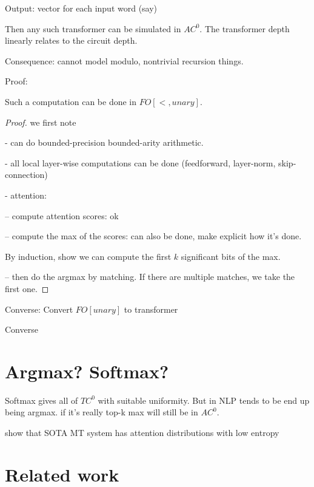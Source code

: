 \documentclass[11pt,a4paper]{article}
\begin{document}
Output: vector for each input word (say)

Then any such transformer can be simulated in $AC^0$. The transformer depth linearly relates to the circuit depth.

Consequence: cannot model modulo, nontrivial recursion things.



Proof:

Such a computation can be done in $FO[<,unary]$.

\begin{proof}
we first note

- can do bounded-precision bounded-arity arithmetic.

- all local layer-wise computations can be done (feedforward, layer-norm, skip-connection)

- attention:

-- compute attention scores: ok

-- compute the max of the scores: can also be done, make explicit how it's done.

By induction, show we can compute the first $k$ significant bits of the max.

-- then do the argmax by matching. If there are multiple matches, we take the first one.

\end{proof}

Converse: Convert $FO[unary]$ to transformer



Converse

\section{Argmax? Softmax?}

Softmax gives all of $TC^0$ with suitable uniformity. But in NLP tends to be end up being argmax. if it's really top-k max will still be in $AC^0$.

show that SOTA MT system has attention distributions with low entropy

\section{Related work}
\end{document}
